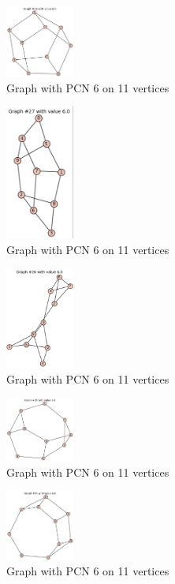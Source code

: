 \documentclass[12pt,a4paper]{amsart}
\theoremstyle{definition}
\theoremstyle{plain}
\begin{document}
\begin{figure}[h]
    \centering
    \includegraphics[width=0.2\textwidth]{Images/16}
    \caption{Graph with PCN 6 on 11 vertices}
\end{figure}
\begin{figure}[h]
    \centering
    \includegraphics[width=0.2\textwidth]{Images/17}
    \caption{Graph with PCN 6 on 11 vertices}
\end{figure}
\begin{figure}[h]
    \centering
    \includegraphics[width=0.2\textwidth]{Images/18}
\caption{Graph with PCN 6 on 11 vertices}
    \end{figure}
\begin{figure}[h]
    \centering
    \includegraphics[width=0.2\textwidth]{Images/19}
    \caption{Graph with PCN 6 on 11 vertices}
\end{figure}
\begin{figure}[h]
    \centering
    \includegraphics[width=0.2\textwidth]{Images/20}
    \caption{Graph with PCN 6 on 11 vertices}
\end{figure}
\end{document}
